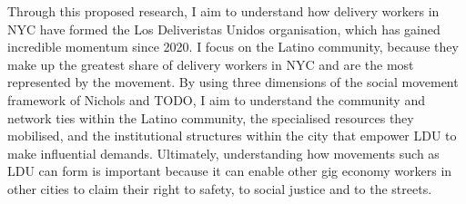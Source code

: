 \documentclass{article}
\begin{document}
Through this proposed research, I aim to understand how delivery workers in NYC have formed the Los Deliveristas Unidos organisation, which has gained incredible momentum since 2020. I focus on the Latino community, because they make up the greatest share of delivery workers in NYC and are the most represented by the movement. By using three dimensions of the social movement framework of Nichols and TODO, I aim to understand the community and network ties within the Latino community, the specialised resources they mobilised, and the institutional structures within the city that empower LDU to make influential demands.
Ultimately, understanding how movements such as LDU can form is important because it can enable other gig economy workers in other cities to claim their right to safety, to social justice and to the streets. 

\pagebreak

\printbibliography
\end{document}
